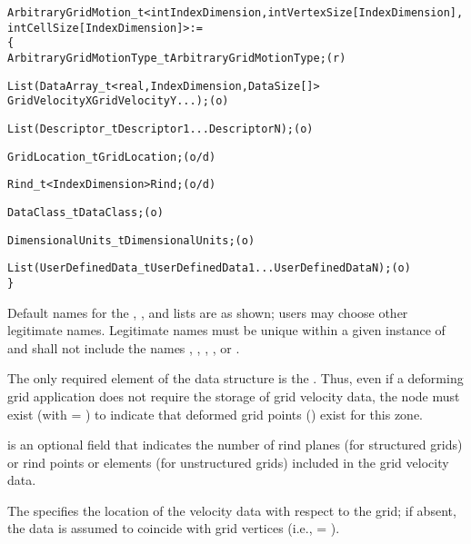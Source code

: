\begin{alltt}
  ArbitraryGridMotion\_t< int IndexDimension, int VertexSize[IndexDimension], 
                         int CellSize[IndexDimension] > :=
    \{
    ArbitraryGridMotionType\_t ArbitraryGridMotionType ;                     (r)

    List(DataArray\_t<real, IndexDimension, DataSize[]>
       GridVelocityX GridVelocityY ... ) ;                                  (o)

    List( Descriptor\_t Descriptor1 ... DescriptorN ) ;                      (o)

    GridLocation\_t GridLocation ;                                           (o/d)

    Rind\_t<IndexDimension> Rind ;                                           (o/d)

    DataClass\_t DataClass ;                                                 (o)

    DimensionalUnits\_t DimensionalUnits ;                                   (o)

    List( UserDefinedData\_t UserDefinedData1 ... UserDefinedDataN ) ;       (o)
    \}
\end{alltt}

\begin{notes}
\item Default names for the , , and
      lists are as shown; users may choose other legitimate names.
      Legitimate names must be unique within a given instance
      of  and shall not include the names
      , ,
      , , or .
\item The only required element of the 
      data structure is the .
      Thus, even if a deforming grid application does not require the
      storage of grid velocity data, the 
      node must exist (with
       = ) to indicate
      that deformed grid points () exist for this
      zone.
\item {} is an optional field that indicates the number of rind
      planes (for structured grids) or rind points or elements (for
      unstructured grids) included in the grid velocity data.
\item The  specifies the location of the velocity
      data with respect to the grid; if absent, the data is assumed
      to coincide with grid vertices (i.e.,  =
      ).
\end{notes}

